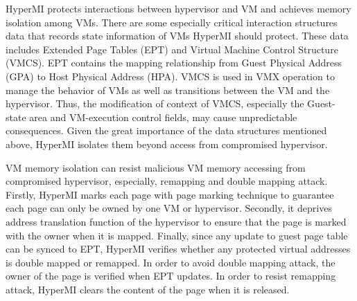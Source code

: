 \documentclass[conference]{IEEEtran}
\begin{document}
HyperMI protects interactions between hypervisor and VM and achieves memory isolation among VMs. 
There are some especially critical interaction structures data that records state information of VMs HyperMI should protect. These data includes Extended Page Tables (EPT) and Virtual Machine Control Structure (VMCS). EPT contains the mapping relationship from Guest Physical Address (GPA) to Host Physical Address (HPA). 
VMCS is used in VMX operation to manage the behavior of VMs as well as transitions between the VM and the hypervisor. Thus, the modification of context of VMCS, especially the Guest-state area and VM-execution control fields, may cause unpredictable consequences. %
Given the great importance of the data structures mentioned above, HyperMI isolates them beyond access from compromised hypervisor.

VM memory isolation can resist malicious VM memory accessing from compromised hypervisor, especially, remapping and double mapping attack.
Firstly, HyperMI marks each page with page marking technique to guarantee each page can only be owned by one VM or hypervisor.
Secondly, it deprives address translation function of the hypervisor to ensure that the page is marked with the owner when it is mapped. 
Finally, since any update to guest page table can be synced to EPT, HyperMI verifies whether any protected virtual addresses is double mapped or remapped.
In order to avoid double mapping attack, the owner of the page is verified when EPT updates.
In order to resist remapping attack, HyperMI clears the content of the page when it is released.
\end{document}

